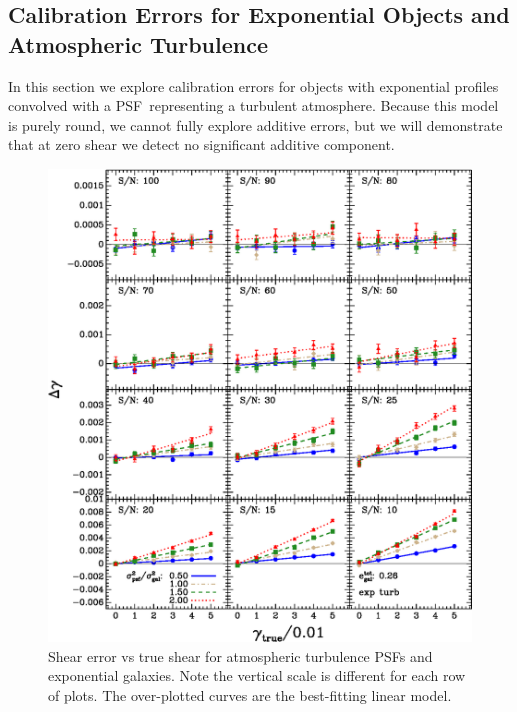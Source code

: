 \documentclass[10pt,preprint]{aastex}
\newcommand{\psf}{PSF}
\begin{document}
\subsection{Calibration Errors for Exponential Objects and Atmospheric Turbulence}

In this section we explore calibration errors for objects with exponential
profiles convolved with a \psf\ representing a turbulent atmosphere.  Because
this model is purely round, we cannot fully explore additive errors, but we
will demonstrate that at zero shear we detect no significant additive component.


\begin{figure}[p] \centering
 \centering 
 \includegraphics[scale=1.1]{figures/set-s2n-et03-vs-shear.eps}

 \caption{Shear error vs true shear for atmospheric turbulence \psf s
 and exponential galaxies.  Note the vertical scale is different for each row
 of plots.  The over-plotted curves are the best-fitting linear model.}
 \label{fig:etdiffvsshroundpsf}

\end{figure}
\end{document}
